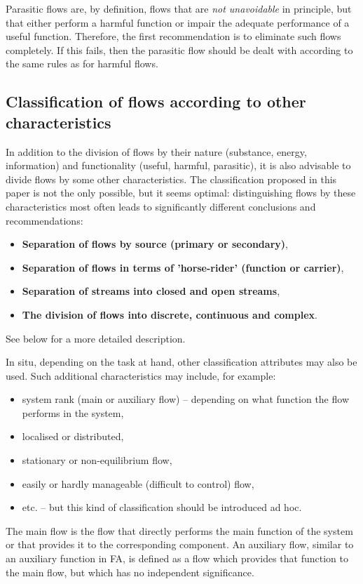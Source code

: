 \documentclass[a4paper,11pt]{article}
\begin{document}
Parasitic flows are, by definition, flows that are \emph{not unavoidable} in
principle, but that either perform a harmful function or impair the adequate
performance of a useful function. Therefore, the first recommendation is to
eliminate such flows completely. If this fails, then the parasitic flow should
be dealt with according to the same rules as for harmful flows.

\subsection{Classification of flows according to other characteristics}

In addition to the division of flows by their nature (substance, energy,
information) and functionality (useful, harmful, parasitic), it is also
advisable to divide flows by some other characteristics. The classification
proposed in this paper is not the only possible, but it seems optimal:
distinguishing flows by these characteristics most often leads to
significantly different conclusions and recommendations:
\begin{itemize}
\item \textbf{Separation of flows by source (primary or secondary)},
\item \textbf{Separation of flows in terms of 'horse-rider' (function or
  carrier)},
\item \textbf{Separation of streams into closed and open streams},
\item \textbf{The division of flows into discrete, continuous and complex}.
\end{itemize}
See below for a more detailed description.

In situ, depending on the task at hand, other classification attributes may
also be used. Such additional characteristics may include, for example:
\begin{itemize}
\item system rank (main or auxiliary flow) -- depending on what function the
  flow performs in the system,
\item localised or distributed,
\item stationary or non-equilibrium flow,
\item easily or hardly manageable (difficult to control) flow,
\item etc. -- but this kind of classification should be introduced ad hoc.
\end{itemize}
The main flow is the flow that directly performs the main function of the
system or that provides it to the corresponding component. An auxiliary flow,
similar to an auxiliary function in FA, is defined as a flow which provides
that function to the main flow, but which has no independent significance.
\end{document}
